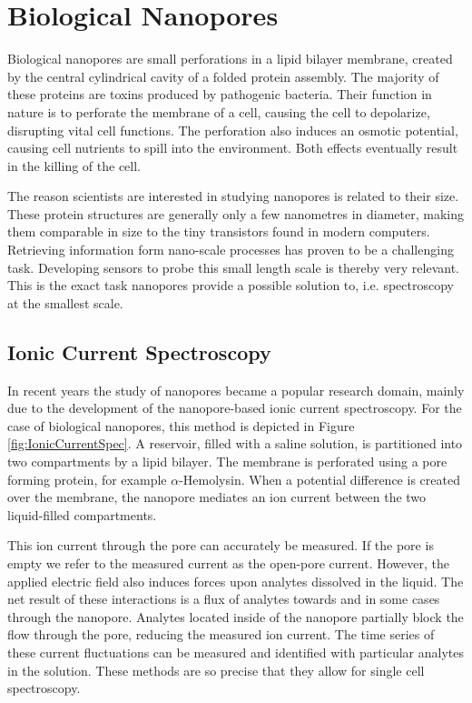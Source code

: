 \section{Biological Nanopores}

Biological nanopores are small perforations in a lipid bilayer membrane, created
by the central cylindrical cavity of a folded protein assembly. The majority of these
proteins are toxins produced by pathogenic bacteria. Their function in nature is to
perforate the membrane of a cell, causing the cell to depolarize, disrupting vital cell
functions. The perforation also induces an osmotic potential, causing cell nutrients to
spill into the environment. Both effects eventually result in the killing of the
cell.\cite{Peraro2016}

The reason scientists are interested in studying nanopores is related to their size.
These protein structures are generally only a few nanometres in diameter, making them
comparable in size to the tiny transistors found in modern computers. Retrieving
information form nano-scale processes has proven to be a challenging task. Developing
sensors to probe this small length scale is thereby very relevant. This is the exact task
nanopores provide a possible solution to, i.e. spectroscopy at the smallest
scale.

\subsection{Ionic Current Spectroscopy}

In recent years the study of nanopores became a popular research domain, mainly
due to the development of the nanopore-based ionic current spectroscopy. For the case of
biological nanopores, this method is depicted in Figure \ref{fig:IonicCurrentSpec}. A
reservoir, filled with a saline solution, is partitioned into two compartments by a
lipid bilayer. The membrane is perforated using a pore forming protein, for example
$\alpha$-Hemolysin.  When a potential difference is created over the membrane, the
nanopore mediates an ion current between the two liquid-filled compartments.

This ion current through the pore can accurately be measured. If the pore is empty we
refer to the measured current as the open-pore current. However, the applied electric
field also induces forces upon analytes dissolved in the liquid. The net result of these
interactions is a flux of analytes towards and in some cases through the nanopore.
Analytes located inside of the nanopore partially block the flow through the pore,
reducing the measured ion current. The time series of
these current fluctuations can be measured and identified with particular analytes in the
solution. These methods are so precise that they allow for single cell
spectroscopy.\cite{Howorka2009}

